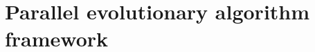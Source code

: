\documentclass[12pt, a4paper]{article}%
\DeclareMathOperator*{\opt}{\ensuremath{opt}}
\renewcommand{\vec}[1]{\mbox{\boldmath \small $#1$}}
\newcommand{\vol}{\mathrm{vol}}
\numberwithin{equation}{section}
\theoremstyle{plain}
\begin{document}
	
	\section{Parallel evolutionary algorithm framework}
	\label{sec::peaf}
	
	
\end{document}
